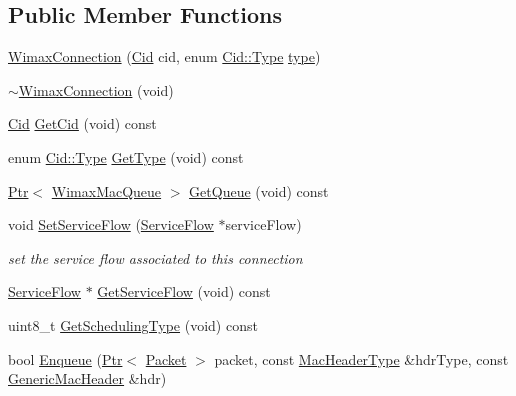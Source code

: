 \subsection*{Public Member Functions}
\begin{DoxyCompactItemize}
\item 
\hyperlink{classns3_1_1WimaxConnection_a32c0bb269da15d24c412350cba7466f1}{Wimax\+Connection} (\hyperlink{classns3_1_1Cid}{Cid} cid, enum \hyperlink{classns3_1_1Cid_a10b8f92080ca5790e65a0bfa2f557e0a}{Cid\+::\+Type} \hyperlink{visualizer-ideas_8txt_add98db9e15e2a58cf2b57623e7aa893a}{type})
\item 
\hyperlink{classns3_1_1WimaxConnection_a1d37284ef870b2d78e1d86adf21c8858}{$\sim$\+Wimax\+Connection} (void)
\item 
\hyperlink{classns3_1_1Cid}{Cid} \hyperlink{classns3_1_1WimaxConnection_a22540186bbe5e147236390df0232a797}{Get\+Cid} (void) const 
\item 
enum \hyperlink{classns3_1_1Cid_a10b8f92080ca5790e65a0bfa2f557e0a}{Cid\+::\+Type} \hyperlink{classns3_1_1WimaxConnection_a8858505fbb422d562753b3d7805db74e}{Get\+Type} (void) const 
\item 
\hyperlink{classns3_1_1Ptr}{Ptr}$<$ \hyperlink{classns3_1_1WimaxMacQueue}{Wimax\+Mac\+Queue} $>$ \hyperlink{classns3_1_1WimaxConnection_a5df7525db9277d05f62e3620f9ae4058}{Get\+Queue} (void) const 
\item 
void \hyperlink{classns3_1_1WimaxConnection_a9494f36649eee7785528efd34c492c9c}{Set\+Service\+Flow} (\hyperlink{classns3_1_1ServiceFlow}{Service\+Flow} $\ast$service\+Flow)
\begin{DoxyCompactList}\small\item\em set the service flow associated to this connection \end{DoxyCompactList}\item 
\hyperlink{classns3_1_1ServiceFlow}{Service\+Flow} $\ast$ \hyperlink{classns3_1_1WimaxConnection_a536b522bad5b24a1cedbadfb2d9392f7}{Get\+Service\+Flow} (void) const 
\item 
uint8\+\_\+t \hyperlink{classns3_1_1WimaxConnection_ab9e47477fd3905c1eb1b210483e0eaee}{Get\+Scheduling\+Type} (void) const 
\item 
bool \hyperlink{classns3_1_1WimaxConnection_a2f7f3bf452c58c3390a096e1b354a86f}{Enqueue} (\hyperlink{classns3_1_1Ptr}{Ptr}$<$ \hyperlink{classns3_1_1Packet}{Packet} $>$ packet, const \hyperlink{classns3_1_1MacHeaderType}{Mac\+Header\+Type} \&hdr\+Type, const \hyperlink{classns3_1_1GenericMacHeader}{Generic\+Mac\+Header} \&hdr)

\end{DoxyCompactItemize}
